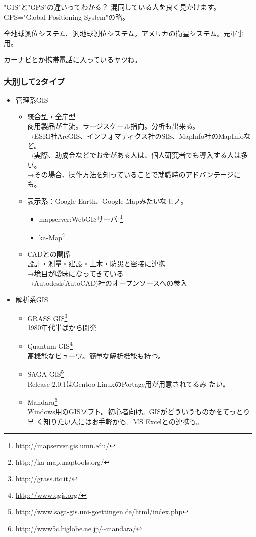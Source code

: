 \documentclass[mingoth,a4paper]{jsarticle}
\begin{document}
\begin{itembox}[c]{"GIS"と"GPS"の違いってわかる？}
混同している人を良く見かけます。GPS="Global Positioning System"の略。

全地球測位システム、汎地球測位システム。アメリカの衛星システム。元軍事用。

カーナビとか携帯電話に入っているヤツね。
\end{itembox}

\subsubsection{大別して2タイプ}
\begin{itemize}
 \item 管理系GIS
       \begin{itemize}
	\item 統合型・全庁型 \\
	      商用製品が主流。ラージスケール指向。分析も出来る。\\
	      →ESRI社ArcGIS、インフォマティクス社のSIS、MapInfo社のMapInfoなど。
	      \\
	      →実際、助成金などでお金がある人は、個人研究者でも導入する人は多
	      い。\\
	      →その場合、操作方法を知っていることで就職時のアドバンテージにも。
	\item 表示系：Google Earth、Google Mapみたいなモノ。
	\begin{itemize}
	 \item mapserver:WebGISサーバ
	       \footnote{\url{http://mapserver.gis.umn.edu/}}
	 \item ka-Map\footnote{\url{http://ka-map.maptools.org/}}
	\end{itemize}
	\item CADとの関係\\
	      設計・測量・建設・土木・防災と密接に連携\\
	      →境目が曖昧になってきている\\
	      →Autodesk(AutoCAD)社のオープンソースへの参入
       \end{itemize}
 \item 解析系GIS
       \begin{itemize}
	\item GRASS GIS\footnote{\url{http://grass.itc.it/}}\\
	      1980年代半ばから開発
	\item Quantum GIS\footnote{\url{http://www.qgis.org/}}\\
	      高機能なビューワ。簡単な解析機能も持つ。
	\item SAGA
	      GIS\footnote{\url{http://www.saga-gis.uni-goettingen.de/html/index.php}}\\
	      Release 2.0.1はGentoo LinuxのPortage用が用意されてるみ
	      たい。
	\item Mandara\footnote{\url{http://www5c.biglobe.ne.jp/~mandara/}}\\
	      Windows用のGISソフト。初心者向け。GISがどういうものかをてっとり早
	      く知りたい人にはお手軽かも。MS Excelとの連携も。
       \end{itemize}
\end{itemize}
\end{document}
